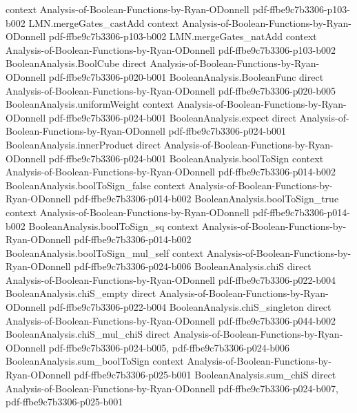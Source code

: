 \begin{lemma}
  {context}
  {Analysis-of-Boolean-Functions-by-Ryan-ODonnell}
  {pdf-ffbe9c7b3306-p103-b002}
\proofstep
  {LMN.mergeGates_castAdd}
  {context}
  {Analysis-of-Boolean-Functions-by-Ryan-ODonnell}
  {pdf-ffbe9c7b3306-p103-b002}
\proofstep
  {LMN.mergeGates_natAdd}
  {context}
  {Analysis-of-Boolean-Functions-by-Ryan-ODonnell}
  {pdf-ffbe9c7b3306-p103-b002}
\proofstep
  {BooleanAnalysis.BoolCube}
  {direct}
  {Analysis-of-Boolean-Functions-by-Ryan-ODonnell}
  {pdf-ffbe9c7b3306-p020-b001}
\proofstep
  {BooleanAnalysis.BooleanFunc}
  {direct}
  {Analysis-of-Boolean-Functions-by-Ryan-ODonnell}
  {pdf-ffbe9c7b3306-p020-b005}
\proofstep
  {BooleanAnalysis.uniformWeight}
  {context}
  {Analysis-of-Boolean-Functions-by-Ryan-ODonnell}
  {pdf-ffbe9c7b3306-p024-b001}
\proofstep
  {BooleanAnalysis.expect}
  {direct}
  {Analysis-of-Boolean-Functions-by-Ryan-ODonnell}
  {pdf-ffbe9c7b3306-p024-b001}
\proofstep
  {BooleanAnalysis.innerProduct}
  {direct}
  {Analysis-of-Boolean-Functions-by-Ryan-ODonnell}
  {pdf-ffbe9c7b3306-p024-b001}
\proofstep
  {BooleanAnalysis.boolToSign}
  {context}
  {Analysis-of-Boolean-Functions-by-Ryan-ODonnell}
  {pdf-ffbe9c7b3306-p014-b002}
\proofstep
  {BooleanAnalysis.boolToSign_false}
  {context}
  {Analysis-of-Boolean-Functions-by-Ryan-ODonnell}
  {pdf-ffbe9c7b3306-p014-b002}
\proofstep
  {BooleanAnalysis.boolToSign_true}
  {context}
  {Analysis-of-Boolean-Functions-by-Ryan-ODonnell}
  {pdf-ffbe9c7b3306-p014-b002}
\proofstep
  {BooleanAnalysis.boolToSign_sq}
  {context}
  {Analysis-of-Boolean-Functions-by-Ryan-ODonnell}
  {pdf-ffbe9c7b3306-p014-b002}
\proofstep
  {BooleanAnalysis.boolToSign_mul_self}
  {context}
  {Analysis-of-Boolean-Functions-by-Ryan-ODonnell}
  {pdf-ffbe9c7b3306-p024-b006}
\proofstep
  {BooleanAnalysis.chiS}
  {direct}
  {Analysis-of-Boolean-Functions-by-Ryan-ODonnell}
  {pdf-ffbe9c7b3306-p022-b004}
\proofstep
  {BooleanAnalysis.chiS_empty}
  {direct}
  {Analysis-of-Boolean-Functions-by-Ryan-ODonnell}
  {pdf-ffbe9c7b3306-p022-b004}
\proofstep
  {BooleanAnalysis.chiS_singleton}
  {direct}
  {Analysis-of-Boolean-Functions-by-Ryan-ODonnell}
  {pdf-ffbe9c7b3306-p044-b002}
\proofstep
  {BooleanAnalysis.chiS_mul_chiS}
  {direct}
  {Analysis-of-Boolean-Functions-by-Ryan-ODonnell}
  {pdf-ffbe9c7b3306-p024-b005,
    pdf-ffbe9c7b3306-p024-b006}
\proofstep
  {BooleanAnalysis.sum_boolToSign}
  {context}
  {Analysis-of-Boolean-Functions-by-Ryan-ODonnell}
  {pdf-ffbe9c7b3306-p025-b001}
\proofstep
  {BooleanAnalysis.sum_chiS}
  {direct}
  {Analysis-of-Boolean-Functions-by-Ryan-ODonnell}
  {pdf-ffbe9c7b3306-p024-b007,
    pdf-ffbe9c7b3306-p025-b001}

\end{lemma}
